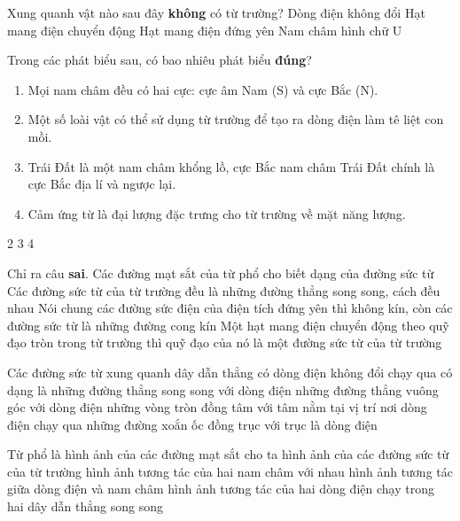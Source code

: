 \begin{ex}
Xung quanh vật nào sau đây \textbf{không} có từ trường?	
	\choice
	{Dòng điện không đổi}
	{Hạt mang điện chuyển động}
	{\True Hạt mang điện đứng yên}
	{Nam châm hình chữ U}
	\loigiai{}
\end{ex}
\begin{ex}
Trong các phát biểu sau, có bao nhiêu phát biểu \textbf{đúng}?	
\begin{enumerate}[label=(\arabic*)]
	\item Mọi nam châm đều có hai cực: cực âm Nam (S) và cực Bắc  (N).
	\item Một số loài vật có thể sử dụng từ trường để tạo ra dòng điện làm tê liệt con mồi.
	\item Trái Đất là một nam châm khổng lồ, cực Bắc nam châm Trái Đất chính là cực Bắc địa lí và ngược lại.
	\item Cảm ứng từ là đại lượng đặc trưng cho từ trường về mặt năng lượng.
\end{enumerate}
	\choice
	{}
	{2}
	{3}
	{4}
\end{ex}
\begin{ex}
Chỉ ra câu \textbf{sai}.	
	\choice
	{Các đường mạt sắt của từ phổ cho biết dạng của đường sức từ}
	{Các đường sức từ của từ trường đều là những đường thẳng song song, cách đều nhau}
	{Nói chung các đường sức điện của điện tích đứng yên thì không kín, còn các đường sức từ là những đường cong kín}
	{\True Một hạt mang điện chuyển động theo quỹ đạo tròn trong từ trường thì quỹ đạo của nó là một đường sức từ của từ trường}
	\loigiai{}
\end{ex}
\begin{ex}
Các đường sức từ xung quanh dây dẫn thẳng có dòng điện không đổi chạy qua có dạng là	
	\choice
	{những đường thẳng song song với dòng điện}
	{những đường thẳng vuông góc với dòng điện}
	{\True những vòng tròn đồng tâm với tâm nằm tại vị trí nơi dòng điện chạy qua}
	{những đường xoắn ốc đồng trục với trục là dòng điện}
	\loigiai{}
\end{ex}
\begin{ex}
	Từ phổ là
	\choice
	{\True hình ảnh của các đường mạt sắt cho ta hình ảnh của các đường sức từ của từ trường}
	{hình ảnh tương tác của hai nam châm với nhau}
	{hình ảnh tương tác giữa dòng điện và nam châm}
	{hình ảnh tương tác của hai dòng điện chạy trong hai dây dẫn thẳng song song}
	\loigiai{}
\end{ex}
